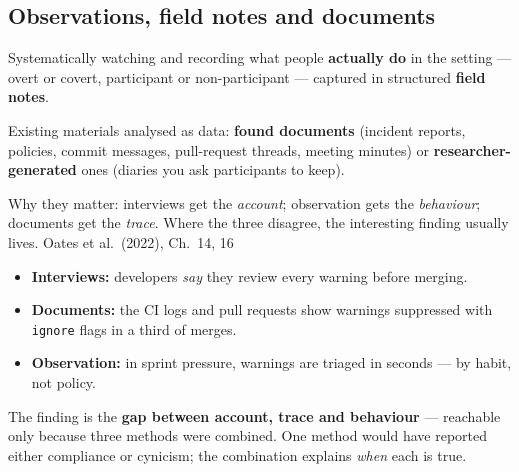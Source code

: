 \documentclass[11pt,a4paper,british,twoside=false,headings=small,chapterprefix=false,numbers=noenddot]{scrbook}
\newenvironment{block}[1]{\begin{tcolorbox}[scriptbox, title={#1}]}{\end{tcolorbox}}
\begin{document}
\subsection{Observations, field notes and documents}
\begin{center}\small
\begin{block}{Observation}
    Systematically watching and recording what people \textbf{actually do}
    in the setting --- overt or covert, participant or non-participant ---
    captured in structured \textbf{field notes}.
  \end{block}
  
  \begin{block}{Documents}
    Existing materials analysed as data: \textbf{found documents} (incident
    reports, policies, commit messages, pull-request threads, meeting
    minutes) or \textbf{researcher-generated} ones (diaries you ask
    participants to keep).
  \end{block}
  
  Why they matter: interviews get the \emph{account}; observation gets the
  \emph{behaviour}; documents get the \emph{trace}. Where the three
  disagree, the interesting finding usually lives.
  \hfill {\color{kgrey}\small Oates et al.\ (2022), Ch.\ 14, 16}
\end{center}

\begin{center}\small
\begin{block}{RQ: how does a development team actually handle security warnings?}
    \begin{itemize}\setlength{\itemsep}{0.35em}
      \item \textbf{Interviews:} developers \emph{say} they review every
            warning before merging.
      \item \textbf{Documents:} the CI logs and pull requests show warnings
            suppressed with \texttt{ignore} flags in a third of merges.
      \item \textbf{Observation:} in sprint pressure, warnings are triaged
            in seconds --- by habit, not policy.
    \end{itemize}
  \end{block}
  
  The finding is the \textbf{gap between account, trace and behaviour} ---
  reachable only because three methods were combined. One method would have
  reported either compliance or cynicism; the combination explains
  \emph{when} each is true.
\end{center}
\end{document}

